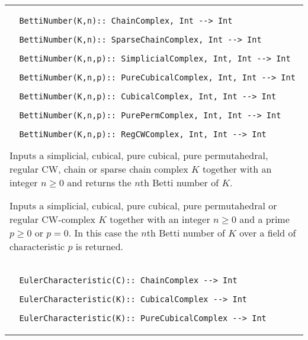 \documentclass[a4paper,11pt]{report}
\begin{document}
{\begin{center}
\begin{tabular}{|l|}
\begin{verbatim}  BettiNumber(K,n):: ChainComplex, Int --> Int
\end{verbatim}
 
\begin{verbatim}  BettiNumber(K,n):: SparseChainComplex, Int --> Int
\end{verbatim}
 
\begin{verbatim}  BettiNumber(K,n,p):: SimplicialComplex, Int, Int --> Int
\end{verbatim}
 
\begin{verbatim}  BettiNumber(K,n,p):: PureCubicalComplex, Int, Int --> Int
\end{verbatim}
 
\begin{verbatim}  BettiNumber(K,n,p):: CubicalComplex, Int, Int --> Int
\end{verbatim}
 
\begin{verbatim}  BettiNumber(K,n,p):: PurePermComplex, Int, Int --> Int
\end{verbatim}
 
\begin{verbatim}  BettiNumber(K,n,p):: RegCWComplex, Int, Int --> Int
\end{verbatim}
 

Inputs a simplicial, cubical, pure cubical, pure permutahedral, regular CW,
chain or sparse chain complex $K$ together with an integer $n \ge 0$ and returns the $n$th Betti number of $K$. 

Inputs a simplicial, cubical, pure cubical, pure permutahedral or regular
CW-complex $K$ together with an integer $n \ge 0$ and a prime $p \ge 0$ or $p=0$. In this case the $n$th Betti number of $K$ over a field of characteristic $p$ is returned. \\
 \index{EulerCharacteristic} 
\begin{verbatim}  EulerCharacteristic(C):: ChainComplex --> Int
\end{verbatim}
 
\begin{verbatim}  EulerCharacteristic(K):: CubicalComplex --> Int
\end{verbatim}
 
\begin{verbatim}  EulerCharacteristic(K):: PureCubicalComplex --> Int
\end{verbatim}
 

\end{tabular}
\end{center}}
\end{document}
